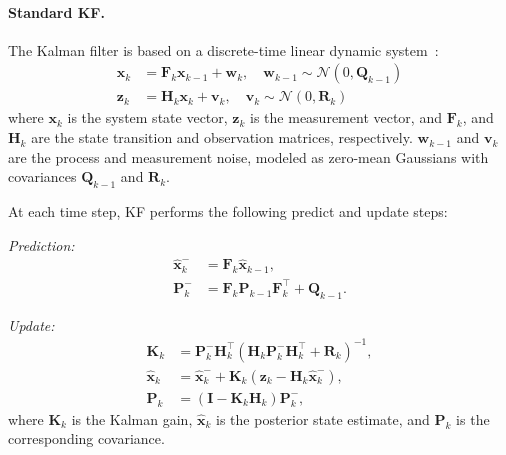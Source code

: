 \paragraph{Standard KF.} The Kalman filter is based on a discrete-time linear dynamic system~\cite{wiley_kalman}:
\begin{align}
    \mathbf{x}_k &= \mathbf{F}_{k} \mathbf{x}_{k-1} + \mathbf{w}_{k}, \quad \mathbf{w}_{k-1} \sim \mathcal{N}(0, \mathbf{Q}_{k-1}) \\
    \mathbf{z}_k &= \mathbf{H}_k \mathbf{x}_k + \mathbf{v}_k, \quad \mathbf{v}_k \sim \mathcal{N}(0, \mathbf{R}_k)
\end{align}
where $\mathbf{x}_k$ is the system state vector, $\mathbf{z}_k$ is the measurement vector,  and $\mathbf{F}_k$, and $\mathbf{H}_k$ are the state transition and observation matrices, respectively. $\mathbf{w}_{k-1}$ and $\mathbf{v}_k$ are the process and measurement noise, modeled as zero-mean Gaussians with covariances $\mathbf{Q}_{k-1}$ and $\mathbf{R}_k$.

At each time step, KF performs the following predict and update steps:

\emph{Prediction:}
\begin{align}
    \hat{\mathbf{x}}_k^- &= \mathbf{F}_k \hat{\mathbf{x}}_{k-1}, \\
    \mathbf{P}_k^- &= \mathbf{F}_k \mathbf{P}_{k-1} \mathbf{F}_k^\top + \mathbf{Q}_{k-1}.
\end{align}

\emph{Update:}
\begin{align}
    \mathbf{K}_k &= \mathbf{P}_k^- \mathbf{H}_k^\top \left( \mathbf{H}_k \mathbf{P}_k^- \mathbf{H}_k^\top + \mathbf{R}_k \right)^{-1}, \\
    \hat{\mathbf{x}}_k &= \hat{\mathbf{x}}_k^- + \mathbf{K}_k (\mathbf{z}_k - \mathbf{H}_k \hat{\mathbf{x}}_k^-), \\
    \mathbf{P}_k &= (\mathbf{I} - \mathbf{K}_k \mathbf{H}_k) \mathbf{P}_k^-,
\end{align}
where $\mathbf{K}_k$ is the Kalman gain, $\hat{\mathbf{x}}_k$ is the posterior state estimate, and $\mathbf{P}_k$ is the corresponding covariance.

